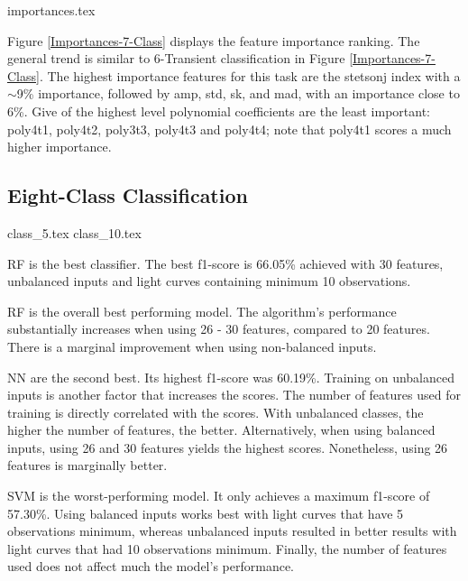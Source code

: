 \documentclass[a4paper,fleqn,usenatbib]{mnras}
\begin{document}
{importances.tex}

Figure \ref{Importances-7-Class} displays the feature importance
ranking. 
The general trend is similar to 6-Transient classification in Figure
\ref{Importances-7-Class}. 
The highest importance features for this task are the
stetson\textunderscore j index with a $\sim$9\% importance, followed by
amp, std, sk, and mad, with an importance close to 6\%. 
Give of the highest level polynomial coefficients are the least
important: poly4\textunderscore t1, poly4\textunderscore t2,
poly3\textunderscore t3, poly4\textunderscore t3 and
poly4\textunderscore t4; note that poly4\textunderscore t1 scores a
much higher importance.  





\subsection{Eight-Class Classification}

{class_5.tex}
{class_10.tex}


RF is the best classifier. The best f1-score is 66.05\% achieved with
30 features, unbalanced inputs and light curves containing minimum 10
observations.  


RF is the overall best performing model.
The algorithm's performance substantially increases when using 26 -
30 features, compared to 20 features.
There is a marginal improvement when using non-balanced inputs. 

NN are the second best. 
Its highest f1-score was 60.19\%. 
Training on unbalanced inputs is another factor that increases the
scores. 
The number of features used for training is directly correlated with
the scores.
With unbalanced classes, the higher the number of features, the
better. 
Alternatively, when using balanced inputs, using 26 and 30 features
yields the highest scores. 
Nonetheless, using 26 features is marginally better. 

SVM is the worst-performing model.
It only achieves a maximum f1-score of 57.30\%.
Using balanced inputs works best with light curves that have 5 
observations minimum, whereas unbalanced inputs
resulted in better results with light curves that had 10 observations
minimum.  
Finally, the number of features used does not affect much the model's
performance.%
\end{document}
